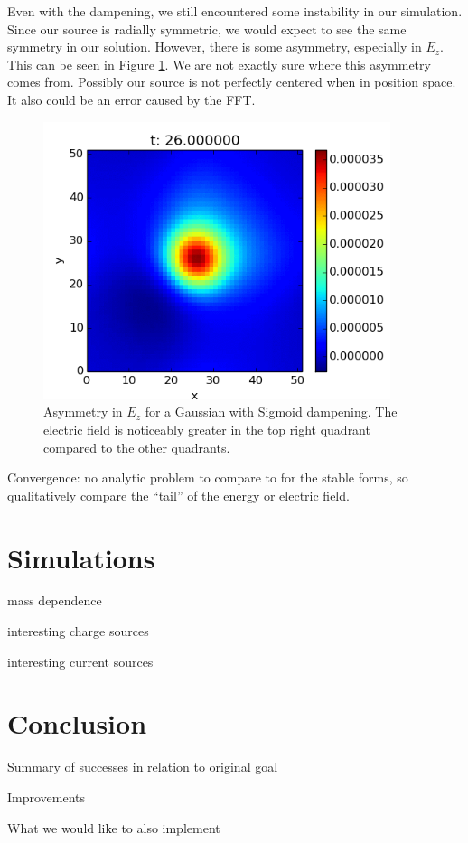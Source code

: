 \documentclass{article}
\begin{document}
	Even with the dampening, we still encountered some instability in our simulation. Since our source is radially symmetric, we would expect to see the same symmetry in our solution. However, there is some asymmetry, especially in $E_z$. This can be seen in Figure \ref{fig:asymmetry}. We are not exactly sure where this asymmetry comes from. Possibly our source is not perfectly centered when in position space. It also could be an error caused by the FFT.
	\begin{figure}
		\centering
		\includegraphics[width=4in]{asymmetry}
		\caption{Asymmetry in $E_z$ for a Gaussian with Sigmoid dampening. The electric field is noticeably greater in the top right quadrant compared to the other quadrants.}
		\label{fig:asymmetry}
	\end{figure} 

	
	Convergence: no analytic problem to compare to for the stable forms, so qualitatively compare the ``tail'' of the energy or electric field.
	
	\section{Simulations}
	
	mass dependence
	
	interesting charge sources
	
	interesting current sources
	
	\section{Conclusion}
	Summary of successes in relation to original goal
	
	Improvements
	
	What we would like to also implement
	
\end{document}
